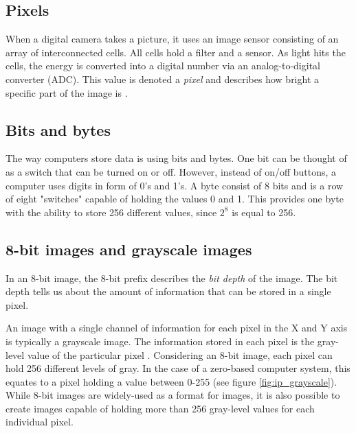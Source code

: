 \subsection{Pixels}
When a digital camera takes a picture, it uses an image sensor consisting of an array of interconnected cells. All cells hold a filter and a sensor. As light hits the cells, the energy is converted into a digital number via an analog-to-digital converter (ADC). This value is denoted a \textit{pixel} and describes how bright a specific part of the image is \citep{ip_book}.

\subsection{Bits and bytes}
The way computers store data is using bits and bytes. One bit can be thought of as a switch that can be turned on or off. However, instead of on/off buttons, a computer uses digits in form of 0's and 1's. A byte consist of 8 bits and is a row of eight "switches" capable of holding the values 0 and 1. This provides one byte with the ability to store 256 different values, since $2^{8}$ is equal to 256. 




\subsection{8-bit images and grayscale images}
In an 8-bit image, the 8-bit prefix describes the \textit{bit depth} of the image. The bit depth tells us about the amount of information that can be stored in a single pixel.


An image with a single channel of information for each pixel in the X and Y axis is typically a grayscale image. The information stored in each pixel is the gray-level value of the particular pixel \citep{ip_book}. Considering an 8-bit image, each pixel can hold 256 different levels of gray. In the case of a zero-based computer system, this equates to a pixel holding a value between 0-255 (see figure \ref{fig:ip_grayscale}). While 8-bit images are widely-used as a format for images, it is also possible to create images capable of holding more than 256 gray-level values for each individual pixel.

